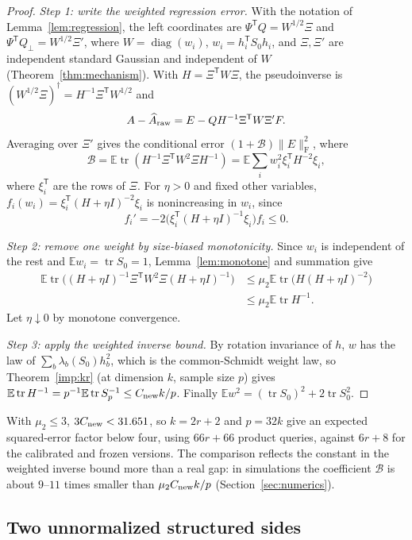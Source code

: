 \documentclass[11pt,a4paper]{article}
\theoremstyle{definition}
\theoremstyle{remark}
\numberwithin{equation}{section}
\newcommand{\E}{\mathbb E}
\newcommand{\T}{{\mathsf T}}
\newcommand{\tr}{\operatorname{tr}}
\newcommand{\diag}{\operatorname{diag}}
\newcommand{\norm}[1]{\lVert#1\rVert}
\newcommand{\F}{\mathrm F}
\begin{document}
\begin{proof}
\emph{Step 1: write the weighted regression error.}
With the notation of Lemma~\ref{lem:regression}, the left coordinates are
$\Psi^\T Q=W^{1/2}\Xi$ and $\Psi^\T Q_\perp=W^{1/2}\Xi'$, where
$W=\diag(w_i)$, $w_i=h_i^\T S_0h_i$, and $\Xi,\Xi'$ are independent standard
Gaussian and independent of $W$ (Theorem~\ref{thm:mechanism}). With
$H=\Xi^\T W\Xi$, the pseudoinverse is
$(W^{1/2}\Xi)^\dagger=H^{-1}\Xi^\T W^{1/2}$ and
\[
 A-\widehat A_{\rm raw}=E-QH^{-1}\Xi^\T W\Xi'F.
\]
Averaging over $\Xi'$ gives the conditional error
$(1+\mathcal B)\norm E_\F^2$, where
\[
 \mathcal B=\E\tr(H^{-1}\Xi^\T W^2\Xi H^{-1})
 =\E\sum_iw_i^2\xi_i^\T H^{-2}\xi_i,
\]
where $\xi_i^\T$ are the rows of $\Xi$. For $\eta>0$ and fixed other variables,
$f_i(w_i)=\xi_i^\T(H+\eta I)^{-2}\xi_i$ is nonincreasing in $w_i$, since
\[
 f_i'=-2\bigl(\xi_i^\T(H+\eta I)^{-1}\xi_i\bigr)f_i\le0.
\]

\emph{Step 2: remove one weight by size-biased monotonicity.}
Since $w_i$ is independent of
the rest and $\E w_i=\tr S_0=1$, Lemma~\ref{lem:monotone} and summation give
\[
 \begin{aligned}
 \E\tr\bigl((H+\eta I)^{-1}\Xi^\T W^2\Xi(H+\eta I)^{-1}\bigr)
 &\le\mu_2\E\tr\bigl(H(H+\eta I)^{-2}\bigr)\\
 &\le\mu_2\E\tr H^{-1}.
 \end{aligned}
\]
Let $\eta\downarrow0$ by monotone convergence.

\emph{Step 3: apply the weighted inverse bound.} By rotation
invariance of $h$, $w$ has the law of $\sum_b\lambda_b(S_0)h_b^2$, which is the
common-Schmidt weight law, so Theorem~\ref{imp:kr} (at dimension $k$,
sample size $p$) gives $\E\tr H^{-1}=p^{-1}\E\tr S_p^{-1}\le C_{\rm new}k/p$.
Finally $\E w^2=(\tr S_0)^2+2\tr S_0^2$.
\end{proof}

With $\mu_2\le3$, $3C_{\rm new}<31.651$, so $k=2r+2$ and $p=32k$ give an expected
squared-error factor below four, using $66r+66$ product queries, against
$6r+8$ for the calibrated and frozen versions. The comparison reflects the
constant in the weighted inverse bound more than a real gap: in simulations
the coefficient $\mathcal B$ is about $9$--$11$ times smaller than $\mu_2C_{\rm new}k/p$
(Section~\ref{sec:numerics}).

\subsection{Two unnormalized structured sides}
\end{document}
